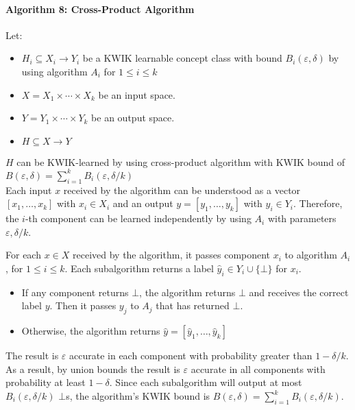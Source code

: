 \paragraph{Algorithm 8: Cross-Product Algorithm}
Let:
\begin{itemize}
  \item $H_i \subseteq X_i \to Y_i$ be a KWIK learnable concept class with bound $B_i(\varepsilon, \delta)$ by using algorithm $A_i$ for $1 \leq i \leq k$
  \item $X = X_1 \times \cdots \times X_k$ be an input space.
  \item $Y = Y_1 \times \cdots \times Y_k$ be an output space.
  \item $H \subseteq X \to Y$
\end{itemize}

$H$ can be KWIK-learned by using cross-product algorithm with KWIK bound of $B(\varepsilon,\delta) =  \sum^{k}_{i=1}B_i(\varepsilon,\delta/k)$ \\

Each input $x$ received by the algorithm can be understood as a vector $[x_1,\ldots,x_k]$ with $x_i \in X_i$ and an output $y = [y_1, \ldots, y_k]$ with $y_i \in Y_i$. Therefore, the $i$-th component can be learned independently by using $A_i$
with parameters $\varepsilon, \delta/k$.

For each $x \in X$ received by the algorithm, it passes component $x_i$ to algorithm $A_i$, for $1 \leq i \leq k$. Each subalgorithm returns a label $\hat{y}_i \in Y_i \cup \{\bot\}$ for $x_i$.
\begin{itemize}
  \item  If any component returns $\bot$, the algorithm returns $\bot$ and receives the correct label $y$.
    Then it passes $y_j$ to $A_j$ that has returned $\bot$.
  \item Otherwise, the algorithm returns $\hat{y} = [\hat{y}_1, \ldots, \hat{y}_k]$
\end{itemize}

The result is $\varepsilon$ accurate in each component with probability greater than $1-\delta/k$. As a result, by union bounds the result is $\varepsilon$ accurate in all components with probability at least $1-\delta$.
Since each subalgorithm will output at most $B_i(\varepsilon,\delta/k)$ $\bot$s, the algorithm's KWIK bound is $B(\varepsilon, \delta) = \sum^{k}_{i=1} B_i(\varepsilon,\delta/k)$.


